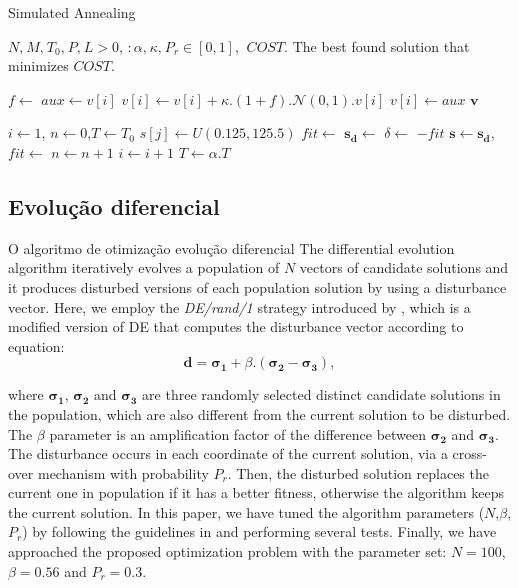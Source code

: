 \begin{algorithm}[ht]
\caption{Simulated Annealing}
\label{alg:sa}
\begin{algorithmic}
\Require $N\text{,}\:M\text{,}\:T_0\text{,}\:P\text{,}\:L> 0$, $:\alpha\text{,}\:\kappa\text{,}\:P_r \in [0,1]$, $\:COST$.
\Ensure The best found solution that minimizes $COST$.

\State $f \gets$ 
\State $aux \gets v[i]$
\State $v[i] \gets v[i]+ \kappa.(1+f).\mathcal{N}(0,1).v[i]$
\State $v[i] \gets aux$
\EndIf
\EndIf
\EndFor
\State \Return $\boldsymbol{v}$
\EndFunction

\State $i \gets 1$, $n \gets 0$,$T \gets T_0$
\State $s[j] \gets U(0.125,125.5)$
\EndFor
\State $fit \gets$  
\Repeat
\State $\boldsymbol{s_d} \gets$ 
\State $\delta \gets$ $- fit$ 
\State $\boldsymbol{s} \gets \boldsymbol{s_d}$,$fit \gets $ 
$n \gets n + 1$
\EndIf
\State $i \gets i + 1$
\State $T \gets \alpha.T$
\end{algorithmic}
\end{algorithm}

\subsection{Evolução diferencial}

O algoritmo de otimização evolução diferencial 
The differential evolution algorithm iteratively evolves a population of $N$ vectors of candidate solutions and it produces disturbed versions of each population solution by using a disturbance vector. Here, we employ the  \emph{DE/rand/1} strategy introduced by \cite{Storn:1996},  which is a modified version of DE that computes the disturbance vector according to equation:
\begin{equation}
\boldsymbol{d} = \boldsymbol{\sigma_1} + \beta.(\boldsymbol{\sigma_2} - \boldsymbol{\sigma_3}),
\end{equation}

\noindent where $\boldsymbol{\sigma_1}$, $\boldsymbol{\sigma_2}$ and $\boldsymbol{\sigma_3}$ are three randomly selected distinct candidate solutions in the population, which are also different from the current solution to be disturbed.  The $\beta$ parameter is an amplification factor of the difference between $\boldsymbol{\sigma_2}$ and $\boldsymbol{\sigma_3}$. The disturbance occurs in each coordinate of the current solution, via a cross-over mechanism with probability $P_r$. Then, the disturbed solution replaces the current one in population if it has a better fitness, otherwise the algorithm keeps the current solution. 
In this paper, we have tuned the algorithm parameters ($N$,$\beta$,$P_r$) by following the guidelines in \cite{Storn:1996} and performing several tests. Finally,  we have approached the proposed optimization problem with the  parameter set: $N = 100$, $\beta = 0.56$ and $P_r = 0.3$.

